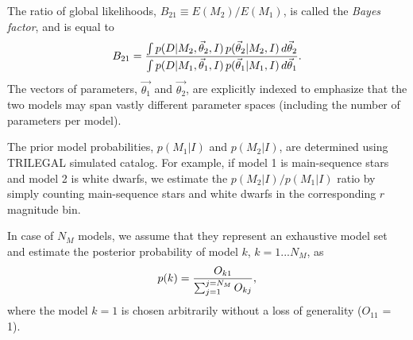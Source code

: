 The ratio of global likelihoods, $B_{21}\equiv E(M_2)/E(M_1)$, is called the {\it Bayes factor}, and
is equal to 
\begin{equation}
     B_{21} = {\int p(D|M_2,\vec{\theta}_2,I) \, p(\vec{\theta}_2|M_2,I) \, d \vec{\theta}_2 \over
                    \int p(D|M_1,\vec{\theta}_1,I) \, p(\vec{\theta}_1|M_1,I) \, d \vec{\theta}_1}.
\end{equation}
The vectors of parameters, $\vec{\theta_1}$ and $\vec{\theta_2}$, are explicitly indexed to emphasize
that the two models may span vastly different parameter spaces (including the  number of
parameters per model).

The prior model probabilities, $p(M_1|I)$ and $p(M_2|I)$, are determined using TRILEGAL simulated catalog.
For example, if model 1 is main-sequence stars and model 2 is white dwarfs, we estimate the $p(M_2|I)/p(M_1|I)$
ratio by simply counting main-sequence stars and white dwarfs in the corresponding $r$ magnitude bin. 

In case of $N_M$ models, we assume that they represent an exhaustive model set and estimate the posterior
probability of model $k$, $k=1...N_M$, as
\begin{equation}
                 p(k) = { O_{k1}  \over \sum_{j=1}^{j=N_M}  O_{kj}},
\end{equation}
where the model $k=1$ is chosen arbitrarily without a loss of generality ($O_{11}$ = 1).



